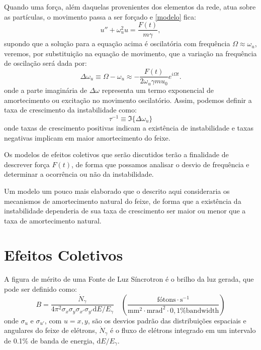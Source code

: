 Quando uma força, além daquelas provenientes dos elementos da rede, atua sobre as partículas, o movimento passa a ser forçado e \eqref{modelo} fica:
\begin{equation}\label{modeloforcado}
 u'' + \omega_u^2 u = \frac{F(t)}{m\gamma},
\end{equation}
supondo que a solução para a equação acima é oscilatória com frequência $\Omega \approx \omega_u$, veremos, por substituição na equação de movimento, que a variação na frequência de oscilação será dada por:
\begin{equation}
\Delta \omega_u \equiv \Omega - \omega_u \approx - \frac{F(t)}{2\omega_u \gamma m u_0}e^{i\Omega t}.
\end{equation}
onde a parte imaginária de $\Delta \omega$ representa um termo exponencial de amortecimento ou excitação no movimento oscilatório. Assim, podemos definir a taxa de crescimento da instabilidade como:
\begin{equation}
 \tau^{-1} \equiv \Im\{\Delta \omega_u\}
\end{equation}
onde taxas de crescimento positivas indicam a existência de instabilidade e taxas negativas implicam em maior amortecimento do feixe.

Os modelos de efeitos coletivos que serão discutidos terão a finalidade de descrever força $F(t)$, de forma que possamos analisar o desvio de frequência e determinar a ocorrência ou não da instabilidade.

Um modelo um pouco mais elaborado que o descrito aqui consideraria os mecanismos de amortecimento natural do feixe, de forma que a existência da instabilidade dependeria de sua taxa de crescimento ser maior ou menor que a taxa de amortecimento natural.

\section{Efeitos Coletivos}
A figura de mérito de uma Fonte de Luz Síncrotron é o brilho da luz gerada, que pode ser definido como:
\begin{equation}\label{eq:defbrilho}
 B=\frac{\dot{N}_\gamma}{4\pi^2\sigma_x\sigma_y\sigma_{x'}\sigma_{y'}\mathrm{d}E
/E_\gamma}\quad \left(\mathrm{\frac{\text{fótons} \cdot s^{-1}}{mm^2 \cdot
mrad^2 \cdot 0,1\% bandwidth}}\right)
\end{equation}
onde $\sigma_u$ e $\sigma_{u'}$, com $u= x, y$, são os desvios padrão das distribuições espaciais e angulares do feixe de elétrons, $\dot{N}_\gamma$ é o fluxo de elétrons integrado em um intervalo de 0.1\% de banda de energia, $\mathrm{d}E/E_\gamma$.

